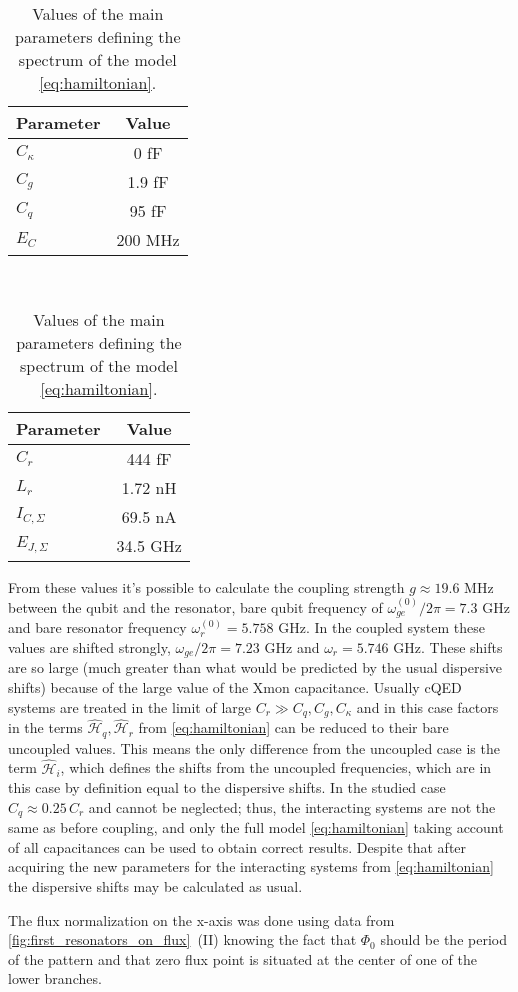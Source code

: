 \begin{table}[h]
\centering
\begin{tabular}{l|c}
Parameter & Value \\
\hline 
$C_\kappa$ & 0 fF \\
\hline
$C_g$ & 1.9 fF \\
\hline
$C_q$ & 95 fF \\
\hline
$E_C$ & 200 MHz
\end{tabular}~
\begin{tabular}{l|c}
Parameter & Value\\
\hline
$C_r$ & 444 fF \\
\hline
$L_r$ & 1.72 nH \\
\hline
$I_{C, \Sigma}$ & 69.5 nA \\
\hline
$E_{J, \Sigma}$ & 34.5 GHz
\end{tabular}
\caption{Values of the main parameters defining the spectrum of the model \eqref{eq:hamiltonian}.}
\label{tab:first_II_params}
\end{table}

From these values it's possible to calculate the coupling strength $g \approx 19.6$ MHz between the qubit and the resonator, bare qubit frequency of $\omega^{(0)}_{ge}/2\pi = 7.3$ GHz and bare resonator frequency $\omega^{(0)}_r = 5.758$ GHz. In the coupled system these values are shifted strongly, $\omega_{ge}/2\pi = 7.23$ GHz and $\omega_r = 5.746$ GHz. These shifts are so large (much greater than what would be predicted by the usual dispersive shifts) because of the large value of the Xmon capacitance. Usually cQED systems are treated in the limit of large $C_r \gg C_q, C_g, C_\kappa$ and in this case factors in the terms $\mathcal{\hat H}_q, \mathcal{\hat H}_r $ from \eqref{eq:hamiltonian} can be reduced to their bare uncoupled values. This means the only difference from the uncoupled case is the term $\mathcal{\hat H}_i$, which defines the shifts from the uncoupled frequencies, which are in this case by definition equal to the dispersive shifts. In the studied case $C_q \approx 0.25\, C_r$ and cannot be neglected; thus, the interacting systems are not the same as before coupling, and only the full model \eqref{eq:hamiltonian} taking account of all capacitances can be used to obtain correct results. Despite that after acquiring the new parameters for the interacting systems from \eqref{eq:hamiltonian} the dispersive shifts may be calculated as usual.

The flux normalization on the x-axis was done using data from \autoref{fig:first_resonators_on_flux}~(II) knowing the fact that $\Phi_0$ should be the period of the pattern and that zero flux point is situated at the center of one of the lower branches.

